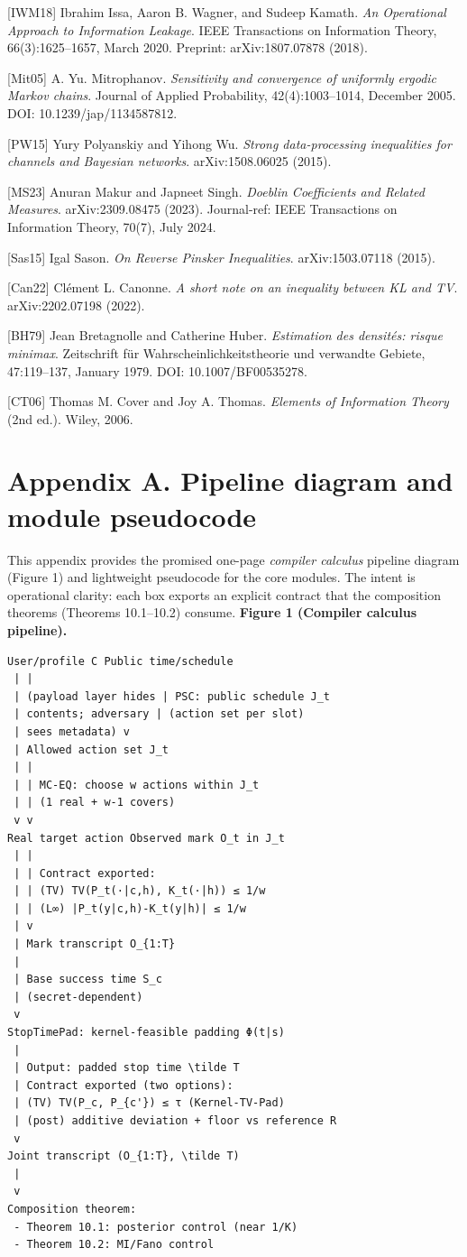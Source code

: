 \documentclass[11pt]{article}
\begin{document}
{[}IWM18{]} Ibrahim Issa, Aaron B. Wagner, and Sudeep Kamath. \emph{An
Operational Approach to Information Leakage}. IEEE Transactions on
Information Theory, 66(3):1625--1657, March 2020. Preprint:
arXiv:1807.07878 (2018).

{[}Mit05{]} A. Yu. Mitrophanov. \emph{Sensitivity and convergence of
uniformly ergodic Markov chains}. Journal of Applied Probability,
42(4):1003--1014, December 2005. DOI: 10.1239/jap/1134587812.

{[}PW15{]} Yury Polyanskiy and Yihong Wu. \emph{Strong data-processing
inequalities for channels and Bayesian networks}. arXiv:1508.06025
(2015).

{[}MS23{]} Anuran Makur and Japneet Singh. \emph{Doeblin Coefficients
and Related Measures}. arXiv:2309.08475 (2023). Journal-ref: IEEE
Transactions on Information Theory, 70(7), July 2024.

{[}Sas15{]} Igal Sason. \emph{On Reverse Pinsker Inequalities}.
arXiv:1503.07118 (2015).

{[}Can22{]} Clément L. Canonne. \emph{A short note on an inequality
between KL and TV}. arXiv:2202.07198 (2022).

{[}BH79{]} Jean Bretagnolle and Catherine Huber. \emph{Estimation des
densités: risque minimax}. Zeitschrift für Wahrscheinlichkeitstheorie
und verwandte Gebiete, 47:119--137, January 1979. DOI:
10.1007/BF00535278.

{[}CT06{]} Thomas M. Cover and Joy A. Thomas. \emph{Elements of
Information Theory} (2nd ed.). Wiley, 2006.

\hypertarget{appendix-a.-pipeline-diagram-and-module-pseudocode}{%
\section{Appendix A. Pipeline diagram and module
pseudocode}\label{appendix-a.-pipeline-diagram-and-module-pseudocode}}

This appendix provides the promised one-page \emph{compiler calculus}
pipeline diagram (Figure 1) and lightweight pseudocode for the core
modules. The intent is operational clarity: each box exports an explicit
contract that the composition theorems (Theorems 10.1--10.2) consume.
\textbf{Figure 1 (Compiler calculus pipeline).}

\begin{verbatim}
User/profile C Public time/schedule
 | |
 | (payload layer hides | PSC: public schedule J_t
 | contents; adversary | (action set per slot)
 | sees metadata) v
 | Allowed action set J_t
 | |
 | | MC-EQ: choose w actions within J_t
 | | (1 real + w-1 covers)
 v v
Real target action Observed mark O_t in J_t
 | |
 | | Contract exported:
 | | (TV) TV(P_t(·|c,h), K_t(·|h)) ≤ 1/w
 | | (L∞) |P_t(y|c,h)-K_t(y|h)| ≤ 1/w
 | v
 | Mark transcript O_{1:T}
 |
 | Base success time S_c
 | (secret-dependent)
 v
StopTimePad: kernel-feasible padding Φ(t|s)
 |
 | Output: padded stop time \tilde T
 | Contract exported (two options):
 | (TV) TV(P_c, P_{c'}) ≤ τ (Kernel-TV-Pad)
 | (post) additive deviation + floor vs reference R
 v
Joint transcript (O_{1:T}, \tilde T)
 |
 v
Composition theorem:
 - Theorem 10.1: posterior control (near 1/K)
 - Theorem 10.2: MI/Fano control
\end{verbatim}
\end{document}
